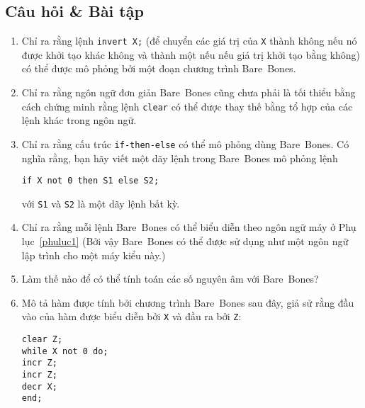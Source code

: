 \subsection*{Câu hỏi \& Bài tập}
\begin{enumerate}
\item Chỉ ra rằng lệnh \texttt{invert X;} (để chuyển các giá trị của \texttt{X} thành
  không nếu nó được khởi tạo khác không và thành một nếu nếu giá trị khởi tạo bằng không)
  có thể được mô phỏng bởi một đoạn chương trình Bare~Bones.

\item Chỉ ra rằng ngôn ngữ đơn giản Bare~Bones cũng chưa phải là tối thiểu bằng cách chứng
  minh rằng lệnh \texttt{clear} có thể được thay thế bằng tổ hợp của các lệnh khác trong
  ngôn ngữ.

\item Chỉ ra rằng cấu trúc \texttt{if-then-else} có thể mô phỏng dùng Bare~Bones. Có nghĩa
  rằng, bạn hãy viết một dãy lệnh trong Bare~Bones mô phỏng lệnh
  \begin{flushleft}
    \qquad \qquad  \texttt{if X not 0 then S1 else S2;}
  \end{flushleft}
  với \texttt{S1} và \texttt{S2} là một dãy lệnh bất kỳ.

\item Chỉ ra rằng mỗi lệnh Bare~Bones có thể biểu diễn theo ngôn ngữ máy ở Phụ
  lục~\ref{phuluc1} (Bởi vậy Bare~Bones có thể được sử dụng như một ngôn ngữ lập trình cho
  một máy kiểu này.)

\item Làm thế nào để có thể tính toán các số nguyên âm với Bare~Bones?

\item Mô tả hàm được tính bởi chương trình Bare~Bones sau đây, giả sử rằng đầu vào của hàm
  được biểu diễn bởi \texttt{X} và đầu ra bởi \texttt{Z}:
  \begin{flushleft}
    \qquad \qquad  \texttt{clear Z;}\\
    \qquad \qquad \texttt{while X not 0 do;} \\
    \qquad \qquad \qquad \texttt{incr  Z;} \\
    \qquad \qquad \qquad \texttt{incr  Z;} \\
    \qquad \qquad \qquad \texttt{decr  X;} \\
    \qquad \qquad \texttt{end;} 
  \end{flushleft}
\end{enumerate}

 
